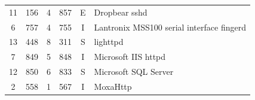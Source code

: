 \begin{table}[!htb]
\begin{tabular}{|c|c|c|c|c|l|}
			\hspace*{-0.15cm} 11	& \hspace*{-0.15cm} 156	& \hspace*{-0.15cm} 4	& \hspace*{-0.15cm} 857	& \hspace*{-0.15cm} E	& \hspace*{-0.15cm} Dropbear sshd	 \\
			\hspace*{-0.15cm} 6	& \hspace*{-0.15cm} 757	& \hspace*{-0.15cm} 4	& \hspace*{-0.15cm} 755	& \hspace*{-0.15cm} I	& \hspace*{-0.15cm} Lantronix MSS100 serial interface fingerd	 \\
			\hspace*{-0.15cm} 13	& \hspace*{-0.15cm} 448	& \hspace*{-0.15cm} 8	& \hspace*{-0.15cm} 311	& \hspace*{-0.15cm} S	& \hspace*{-0.15cm} lighttpd	 \\
			\hspace*{-0.15cm} 7	& \hspace*{-0.15cm} 849	& \hspace*{-0.15cm} 5	& \hspace*{-0.15cm} 848	& \hspace*{-0.15cm} I	& \hspace*{-0.15cm} Microsoft IIS httpd	 \\
			\hspace*{-0.15cm} 12	& \hspace*{-0.15cm} 850	& \hspace*{-0.15cm} 6	& \hspace*{-0.15cm} 833	& \hspace*{-0.15cm} S	& \hspace*{-0.15cm} Microsoft SQL Server	 \\
			\hspace*{-0.15cm} 2	& \hspace*{-0.15cm} 558	& \hspace*{-0.15cm} 1	& \hspace*{-0.15cm} 567	& \hspace*{-0.15cm} I	& \hspace*{-0.15cm} MoxaHttp	 \\

\end{tabular}
\end{table}
